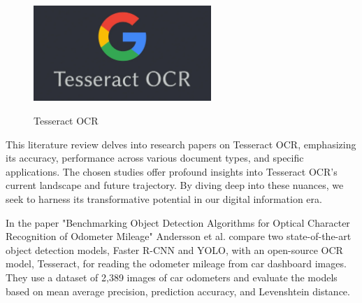 \begin{figure}[ht]
    \centering
    \includegraphics[width=0.6\textwidth]{Figures/tesseract_ocr.jpg}
    \caption[Tesseract OCR]{Tesseract OCR}\cite{liTrOCRTransformerBasedOptical2023}
    \label{fig:Tesseract OCR}
\end{figure}



This literature review delves into research papers on Tesseract OCR, emphasizing its accuracy, performance across various document types, and specific applications. The chosen studies offer profound insights into Tesseract OCR's current landscape and future trajectory. By diving deep into these nuances, we seek to harness its transformative potential in our digital information era.

In the paper "Benchmarking Object Detection Algorithms for Optical Character Recognition of Odometer Mileage" Andersson et al. compare two state-of-the-art object detection models, Faster R-CNN and YOLO, with an open-source OCR model, Tesseract, for reading the odometer mileage from car dashboard images. They use a dataset of 2,389 images of car odometers and evaluate the models based on mean average precision, prediction accuracy, and Levenshtein distance.


